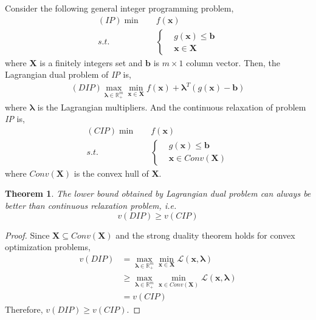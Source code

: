\documentclass{article}
\newtheorem{thm}{Theorem}
\begin{document}
 Consider the following general integer programming problem,
 \begin{align}
 	(\textit{IP}) \min \quad & f(\bm{x}) \\
	s.t. \quad & \left\{ 
	\begin{aligned}
	& g(\bm{x}) \leq \bm{b} \\
	& \bm{x} \in \bm{X} 
	\end{aligned} \right.
 \end{align} 
 where $\bm{X}$ is a finitely integers set and $\bm{b}$ is $m \times 1$ column vector. Then, the Lagrangian dual problem of \textit{IP} is,
 \begin{align}
 	(DIP) \max_{\bm{\lambda} \in \mathbb{R}_+^m} \min_{\bm{x} \in \bm{X}} f(\bm{x}) + \bm{\lambda}^T(g(\bm{x}) - \bm{b})
 \end{align}
 where $\bm{\lambda}$ is the Lagrangian multipliers. And the continuous relaxation of problem \textit{IP} is,
 \begin{align}
  	(\textit{CIP}) \min \quad & f(\bm{x}) \\
	 s.t. \quad & \left\{ 
	 \begin{aligned}
	 & g(\bm{x}) \leq \bm{b} \\
	 & \bm{x} \in Conv(\bm{X}) 
	 \end{aligned} \right.
 \end{align}
 where $Conv(\bm{X})$ is the convex hull of $\bm{X}$.

\begin{thm}
	The lower bound obtained by Lagrangian dual problem can always be better than continuous relaxation problem, i.e.
	\begin{equation} 
		v(DIP) \geq v(CIP)
	\end{equation}
\end{thm}

\begin{proof}
	Since $\bm{X} \subseteq Conv(\bm{X})$ and the strong duality theorem holds for convex optimization problems,
	\begin{align}
		v(DIP) & = \max_{\bm{\lambda} \in \mathbb{R}_+^m} \min_{\bm{x} \in \bm{X}} \mathcal{L}(\bm{x}, \bm{\lambda}) \\
		& \geq \max_{\bm{\lambda} \in \mathbb{R}_+^m} \min_{\bm{x} \in Conv(\bm{X})} \mathcal{L}(\bm{x}, \bm{\lambda}) \\
		& = v(CIP)
	\end{align}
	Therefore, $v(DIP) \geq v(CIP)$.
\end{proof}
\end{document}
